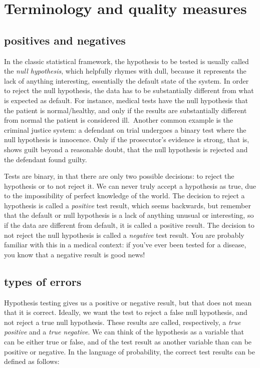 \documentclass[
]{book}
\theoremstyle{definition}
\theoremstyle{definition}
\theoremstyle{definition}
\theoremstyle{remark}
\begin{document}
\hypertarget{terminology-and-quality-measures}{%
\section{Terminology and quality measures}\label{terminology-and-quality-measures}}

\hypertarget{positives-and-negatives}{%
\subsection{positives and negatives}\label{positives-and-negatives}}

In the classic statistical framework, the hypothesis to be tested is usually called the \emph{null hypothesis}, which helpfully rhymes with dull, because it represents the lack of anything interesting, essentially the default state of the system. In order to reject the null hypothesis, the data has to be substantially different from what is expected as default. For instance, medical tests have the null hypothesis that the patient is normal/healthy, and only if the results are substantially different from normal the patient is considered ill.~Another common example is the criminal justice system: a defendant on trial undergoes a binary test where the null hypothesis is innocence. Only if the prosecutor's evidence is strong, that is, shows guilt beyond a reasonable doubt, that the null hypothesis is rejected and the defendant found guilty.

Tests are binary, in that there are only two possible decisions: to reject the hypothesis or to not reject it. We can never truly accept a hypothesis as true, due to the impossibility of perfect knowledge of the world. The decision to reject a hypothesis is called a \emph{positive} test result, which seems backwards, but remember that the default or null hypothesis is a lack of anything unusual or interesting, so if the data are different from default, it is called a positive result. The decision to not reject the null hypothesis is called a \emph{negative} test result. You are probably familiar with this in a medical context: if you've ever been tested for a disease, you know that a negative result is good news!

\hypertarget{types-of-errors}{%
\subsection{types of errors}\label{types-of-errors}}

Hypothesis testing gives us a positive or negative result, but that does not mean that it is correct. Ideally, we want the test to reject a false null hypothesis, and not reject a true null hypothesis. These results are called, respectively, a \emph{true positive} and a \emph{true negative}. We can think of the hypothesis as a variable that can be either true or false, and of the test result as another variable than can be positive or negative. In the language of probability, the correct test results can be defined as follows:
\end{document}
